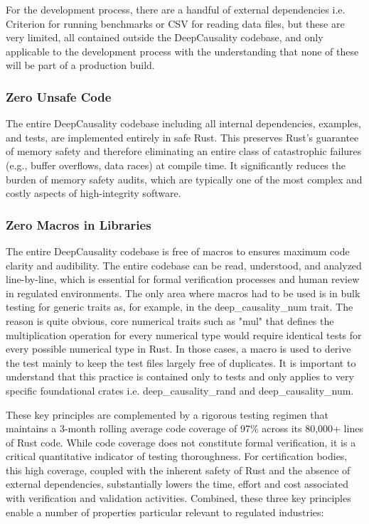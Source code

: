 For the development process, there are a handful of external dependencies i.e. Criterion for running benchmarks or CSV for reading data files, but these are very limited, all contained outside the DeepCausality codebase, and only applicable to the development process with the understanding that none of these will be part of a production build.  

\subsubsection{Zero Unsafe Code}

The entire DeepCausality codebase including all internal dependencies, examples, and tests, are implemented entirely in safe Rust. This preserves Rust's guarantee of memory safety and therefore eliminating an entire class of catastrophic failures (e.g., buffer overflows, data races) at compile time. It significantly reduces the burden of memory safety audits, which are typically one of the most complex and costly aspects of high-integrity software.

\subsubsection{Zero Macros in Libraries}

The entire DeepCausality codebase is free of macros to ensures maximum code clarity and audibility. The entire codebase can be read, understood, and analyzed line-by-line, which is essential for formal verification processes and human review in regulated environments. The only area where macros had to be used is in bulk testing for generic traits as, for example, in the deep\_causality\_num trait. The reason is quite obvious, core numerical traits such as "mul" that defines the multiplication operation for every numerical type would require identical tests for every possible numerical type in Rust. In those cases, a macro is used to derive the test mainly to keep the test files largely free of duplicates. It is important to understand that this practice is contained only to tests and only applies to very specific foundational crates i.e. deep\_causality\_rand and deep\_causality\_num. 


These key principles are complemented by a rigorous testing regimen that maintains a 3-month rolling average code coverage of 97\% across its 80,000+ lines of Rust code. While code coverage does not constitute formal verification, it is a critical quantitative indicator of testing thoroughness. For certification bodies, this high coverage, coupled with the inherent safety of Rust and the absence of external dependencies, substantially lowers the time, effort and cost associated with verification and validation activities. Combined, these three key principles enable a number of properties particular relevant to regulated industries:

